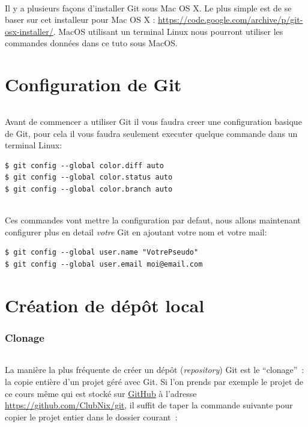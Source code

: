 \documentclass[french, a4paper, 12pt, titlepage]{article}
\begin{document}
\paragraph{}Il y a plusieurs façons d’installer Git sous Mac OS X. Le plus simple est de se baser sur cet installeur pour Mac OS X : 
\url{https://code.google.com/archive/p/git-osx-installer/}. 
MacOS utilisant un terminal Linux nous pourront utiliser les commandes données dans ce tuto sous MacOS.

\part{Configuration de Git}
\paragraph{}Avant de commencer a utiliser Git il vous faudra creer une configuration basique de Git, pour cela il vous faudra seulement executer quelque commande dans un terminal Linux:
\begin{lstlisting}
$ git config --global color.diff auto
$ git config --global color.status auto
$ git config --global color.branch auto
\end{lstlisting}
\paragraph{}Ces commandes vont mettre la configuration par defaut, nous allons maintenant configurer plus en detail \emph{votre} Git en ajoutant votre nom et votre mail:
\begin{lstlisting}
$ git config --global user.name "VotrePseudo"
$ git config --global user.email moi@email.com
\end{lstlisting}


\part{Création de dépôt local}

\section{Clonage}

\paragraph{} La manière la plus fréquente de créer un dépôt
(\emph{repository}) Git est le ``clonage''~: la copie entière d'un projet géré avec Git. Si l'on prends par exemple le projet de ce cours même qui est stocké sur \href{https://github.com}{GitHub} à l'adresse
\url{https://github.com/ClubNix/git}, il suffit de taper la commande suivante pour copier le projet entier dans le dossier courant~:
\end{document}
